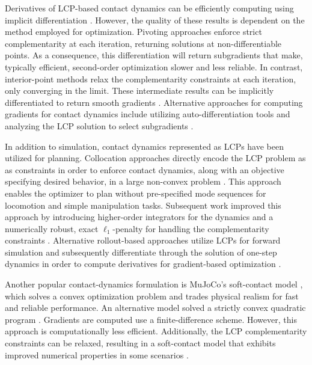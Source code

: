 Derivatives of LCP-based contact dynamics can be efficiently computing using implicit differentiation \cite{dini1907lezioni}. However, the quality of these results is dependent on the method employed for optimization. Pivoting approaches enforce strict complementarity at each iteration, returning solutions at non-differentiable points. As a consequence, this differentiation will return subgradients that make, typically efficient, second-order optimization slower and less reliable. In contrast, interior-point methods relax the complementarity constraints at each iteration, only converging in the limit. These intermediate results can be implicitly differentiated to return smooth gradients \cite{howell2022dojo}. Alternative approaches for computing gradients for contact dynamics include utilizing auto-differentiation tools \cite{heiden2020neuralsim} and analyzing the LCP solution to select subgradients \cite{werling2021fast}.

In addition to simulation, contact dynamics represented as LCPs have been utilized for planning. Collocation approaches \cite{stryk1993numerical} directly encode the LCP problem as  as constraints in order to enforce contact dynamics, along with an objective specifying desired behavior, in a large non-convex problem \cite{posa2014direct}. This approach enables the optimizer to plan without pre-specified mode sequences for locomotion and simple manipulation tasks. Subsequent work improved this approach by introducing higher-order integrators for the dynamics and a numerically robust, exact $\ell_1$-penalty for handling the complementarity constraints \cite{manchester2020variational}. Alternative rollout-based approaches utilize LCPs for forward simulation and subsequently differentiate through the solution of one-step dynamics in order to compute derivatives for gradient-based optimization \cite{de2018end,werling2021fast}.

Another popular contact-dynamics formulation is MuJoCo's soft-contact model \cite{todorov2012mujoco}, which solves a convex optimization problem and trades physical realism for fast and reliable performance. An alternative model solved a strictly convex quadratic program \cite{anitescu2006optimization}. Gradients are computed use a finite-difference scheme. However, this approach is computationally less efficient. Additionally, the LCP complementarity constraints can be relaxed, resulting in a soft-contact model that exhibits improved numerical properties in some scenarios \cite{geilinger2020add}. 

